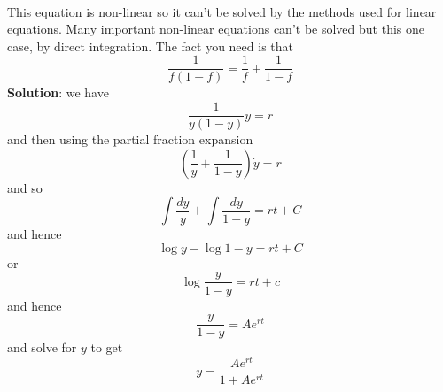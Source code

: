 \documentclass[11pt,a4paper]{scrartcl}
\begin{document}
\begin{enumerate}
\\
This equation is non-linear so it can't be solved by the methods used for linear equations. Many important non-linear equations can't be solved but this one case, by direct integration. The fact you need is that
\begin{equation}
  \frac{1}{f(1-f)}=\frac{1}{f}+\frac{1}{1-f}
\end{equation}
\textbf{Solution}:
 we have
\begin{equation}
  \frac{1}{y(1-y)} \dot{y}=r
\end{equation}
and then using the partial fraction expansion
\begin{equation}
  \left(\frac{1}{y}+\frac{1}{1-y}\right)\dot{y}=r
\end{equation}
and so
\begin{equation}
  \int{\frac{dy}{y}}+\int{\frac{dy}{1-y}}=rt+C
\end{equation}
and hence
\begin{equation}
  \log{y}-\log{1-y}=rt+C
\end{equation}
or
\begin{equation}
  \log{\frac{y}{1-y}}=rt+c
\end{equation}
and hence
\begin{equation}
  \frac{y}{1-y}=Ae^{rt}
\end{equation}
and solve for $y$ to get
\begin{equation}
  y=\frac{Ae^{rt}}{1+Ae^{rt}}
  \end{equation}



          
        
\end{enumerate}
\end{document}
